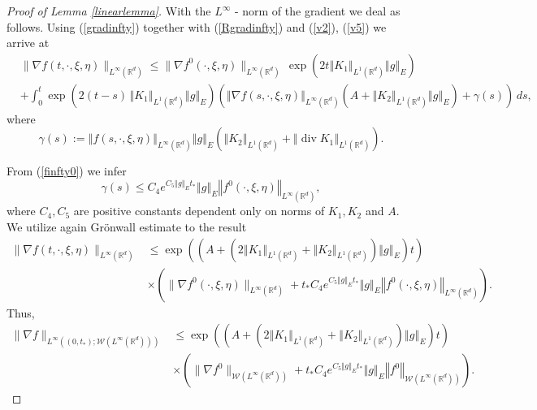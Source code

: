 \documentclass[10pt]{article}
\def\divv{\operatorname {div}}
\newcommand*{\norm}[1]{\left\Vert{#1}\right\Vert}
\newcommand{\R}{\mathbb{R}}
\newcommand{\W}{\mathcal{W}}
\begin{document}
\begin{proof}[Proof of Lemma \ref{linearlemma}]
With the $L^{\infty}$ - norm of the gradient we deal as follows. Using (\ref{gradinfty}) together with (\ref{Rgradinfty}) and (\ref{v2}), (\ref{v5}) we arrive at
\[
  \begin{split}
    &\|\nabla f(t,\cdot,\xi,\eta)\|_{L^{\infty}( \R^d)}\leq \|\nabla f^0(\cdot,\xi,\eta)\|_{L^{\infty}(\R^d )}\,\exp\left(2t \norm{K_1}_{L^{1}(\R^d)}\norm{g}_{E}\right)\\
        &+\int_0^t \exp\left(2(t-s)\,\norm{K_1}_{L^{1}(\R^d)}\norm{g}_{E}\right)\left( \norm{\nabla f(s,\cdot,\xi,\eta)}_{L^{\infty}(\R^d)}\left(A+\norm{K_{2}}_{L^{1}(\R^d)}\norm{g}_{E} \right)+ \gamma(s) \right)\,ds,
\end{split}
\]
where
\[
\gamma(s) := \norm{f(s,\cdot,\xi,\eta)}_{L^{\infty}(\R^d)}\norm{g}_{E}  (\norm{K_{2}}_{L^{1}(\R^d)}+\norm{\divv K_1}_{L^{1}(\R^d)}).
\]

From (\ref{finfty0}) we infer 
\[
\gamma(s) \leq C_4e^{ C_5\norm{g}_{E}t_{*}}\norm{g}_{E}\norm{f^0(\cdot,\xi,\eta)}_{L^{\infty}(\R^d)},
\]
where $C_{4},C_{5}$ are positive constants dependent only on norms of $K_{1}, K_2$ and $A$.
We utilize again Gr\"onwall estimate to the result
\begin{align*}
    \|\nabla f(t,\cdot,\xi,\eta)\|_{L^{\infty}(\R^d)} &\leq \exp\left(\left(A+(2\norm{K_{1}}_{L^{1}(\R^d)}+\norm{K_{2}}_{L^{1}(\R^d)})\norm{g}_{E}\right)t\right)\\ \nonumber
&\times \left( \|\nabla f^0(\cdot,\xi,\eta)\|_{L^{\infty}(\R^d)} + t_{*}C_4e^{ C_5\norm{g}_{E}t_{*}}\norm{g}_{E}\norm{f^0(\cdot,\xi,\eta)}_{L^{\infty}(\R^d)}\right).  
\end{align*}
Thus,
\begin{align}\label{gradlinfty}
       \|\nabla f\|_{L^{\infty}((0,t_*);\W(L^{\infty}(\R^d)))} &\leq \exp\left(\left(A+(2\norm{K_{1}}_{L^{1}(\R^d)}+\norm{K_{2}}_{L^{1}(\R^d)})\norm{g}_{E}\right)t\right)\\ \nonumber
&\times \left( \|\nabla f^0\|_{\W(L^{\infty}(\R^d))} + t_{*}C_4e^{ C_5\norm{g}_{E}t_{*}}\norm{g}_{E}\norm{f^0}_{\W(L^{\infty}(\R^d))}\right).
\end{align}


\end{proof}
\end{document}

